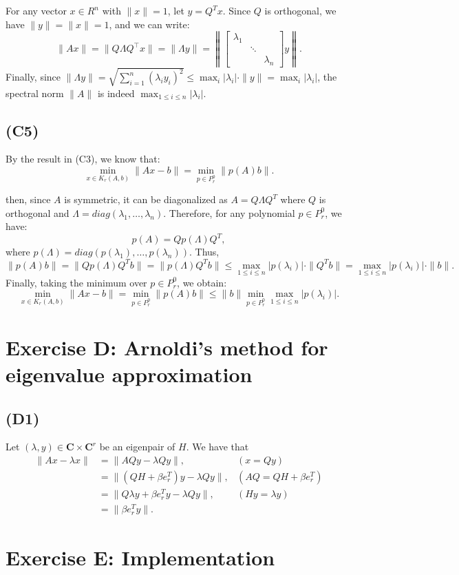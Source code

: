 \documentclass{article}
\begin{document}
For any vector $ x \in R^n $ with $ \|x\| = 1 $, let $ y = Q^T x $. 
Since $ Q $ is orthogonal, we have $ \|y\| = \|x\| = 1 $, and we can write:
 \[
\|Ax\| = \|Q \Lambda Q^\top x\| = \|\Lambda y\| = \left\|
   [\begin{array}{ccc}
        \lambda_1 & &  \\
         & \ddots &  \\
         & & \lambda_n 
    \end{array} ] y\right \|.
\]
Finally, since $ \|\Lambda y\| = \sqrt{\sum_{i=1}^n (\lambda_i y_i)^2} \leq \max_{i} |\lambda_i| \cdot \|y\| = \max_{i} |\lambda_i| $, the spectral norm $ \|A\| $ is indeed $ \max_{1 \leq i \leq n} |\lambda_i| $.

\subsection*{(C5)}
By the result in (C3), we know that:
   \[
   \min_{x \in K_r(A, b)} \|Ax - b\| = \min_{p \in P_r^0} \|p(A)b\|.
   \]

then, since $ A $ is symmetric, it can be diagonalized as $ A = Q\Lambda Q^T$ where $ Q $ is orthogonal and $ \Lambda = diag(\lambda_1, \dots, \lambda_n) $.
Therefore, for any polynomial $ p \in P_r^0 $, we have:
   \[
   p(A) = Q p(\Lambda) Q^T,
   \]
   where $ p(\Lambda) = diag(p(\lambda_1), \dots, p(\lambda_n)) $.
 Thus,
   \[
   \|p(A) b\| = \|Q p(\Lambda) Q^T b\| = \|p(\Lambda) Q^T b\| \leq \max_{1 \leq i \leq n} |p(\lambda_i)| \cdot \|Q^T b\| = \max_{1 \leq i \leq n} |p(\lambda_i)| \cdot \|b\|.
   \]
Finally, taking the minimum over $ p \in P_r^0 $, we obtain:
   \[
   \min_{x \in K_r(A, b)} \|Ax - b\| = \min_{p \in P_r^0} \|p(A) b\| \leq \|b\| \min_{p \in P_r^0} \max_{1 \leq i \leq n} |p(\lambda_i)|.
   \]

\section{Exercise D: Arnoldi’s method for eigenvalue approximation}
\subsection*{(D1)}
Let $(\lambda, y) \in \mathbf{C} \times \mathbf{C}^r$ be an eigenpair of $H$. We have that
\begin{align*}
    \|Ax-\lambda x \| & = \|AQy-\lambda Qy \|, & (x=Qy)\\
    &=\|(QH+\beta e_r^T)y-\lambda Qy \|, &  (AQ = QH+\beta e_r^T) \\
    &=\|Q \lambda y+\beta e_r^Ty-\lambda Qy \|, & (Hy=\lambda y)\\
    &=\|\beta e_r^Ty \|. &
\end{align*}
\section{Exercise E: Implementation}
\end{document}
